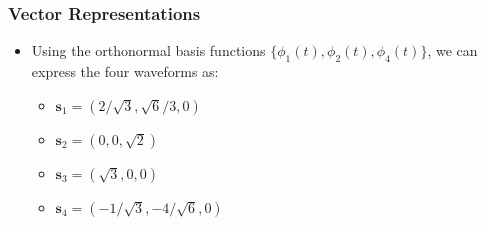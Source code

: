 \documentclass[10pt]{beamer}
\begin{document}
\frame
{
  \frametitle{Vector Representations}

    \begin{itemize}
        \item Using the orthonormal basis functions $\{\phi_1(t),\phi_2(t),\phi_4(t)\}$, we can express the four waveforms as:
            \begin{itemize}
                \item $\mathbf{s}_1=(2/\sqrt{3},\sqrt{6}/3,0)$
                \item $\mathbf{s}_2=(0,0,\sqrt{2})$
                \item $\mathbf{s}_3=(\sqrt{3},0,0)$
                \item $\mathbf{s}_4=(-1/\sqrt{3},-4/\sqrt{6},0)$
            \end{itemize}
    \end{itemize}

}
\end{document}
